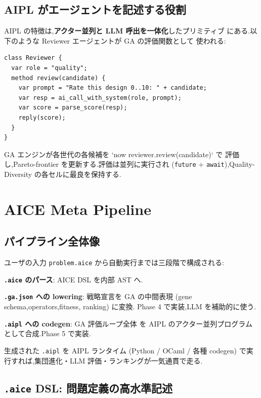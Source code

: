 \documentclass[11pt,a4paper]{article}
\newcommand{\code}[1]{\texttt{\small #1}}
\begin{document}
\subsection{AIPL がエージェントを記述する役割}

AIPL の特徴は,\textbf{アクター並列と LLM 呼出を一体化}したプリミティブ
にある.以下のような Reviewer エージェントが GA の評価関数として
使われる:

\begin{lstlisting}
class Reviewer {
  var role = "quality";
  method review(candidate) {
    var prompt = "Rate this design 0..10: " + candidate;
    var resp = ai_call_with_system(role, prompt);
    var score = parse_score(resp);
    reply(score);
  }
}
\end{lstlisting}

GA エンジンが各世代の各候補を `now reviewer.review(candidate)` で
評価し,Pareto-frontier を更新する.評価は並列に実行され (\code{future}
+ \code{await}),Quality-Diversity の各セルに最良を保持する.

\section{AICE Meta Pipeline}
\label{sec:pipeline}

\subsection{パイプライン全体像}

ユーザの入力 \code{problem.aice} から自動実行までは三段階で構成される:

\begin{description}[leftmargin=*]
  \item[Stage 1.] \textbf{\code{.aice} のパース}: AICE DSL を内部 AST へ.
  \item[Stage 2.] \textbf{\code{.ga.json} への lowering}: 戦略宣言を
    GA の中間表現 (gene schema,operators,fitness, ranking) に変換.
    Phase 4 で実装,LLM を補助的に使う.
  \item[Stage 3.] \textbf{\code{.aipl} への codegen}: GA 評価ループ全体
    を AIPL のアクター並列プログラムとして合成.Phase 5 で実装.
\end{description}

生成された \code{.aipl} を AIPL ランタイム (Python / OCaml / 各種 codegen)
で実行すれば,集団進化・LLM 評価・ランキングが一気通貫で走る.

\subsection{\code{.aice} DSL: 問題定義の高水準記述}
\end{document}

